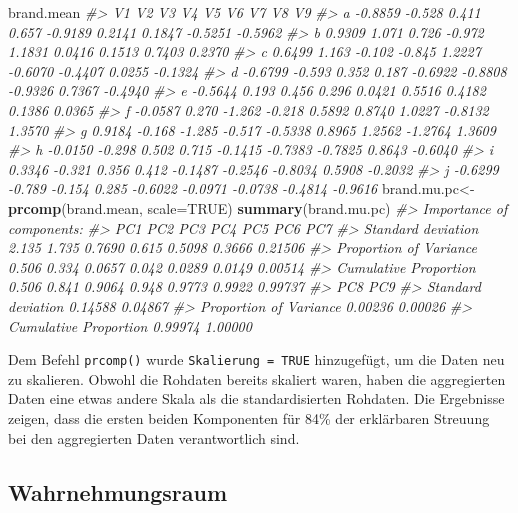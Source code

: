 \documentclass[12pt,]{book}
\newenvironment{Shaded}{\begin{snugshade}}{\end{snugshade}}
\newcommand{\KeywordTok}[1]{\textcolor[rgb]{0.13,0.29,0.53}{\textbf{{#1}}}}
\newcommand{\DataTypeTok}[1]{\textcolor[rgb]{0.13,0.29,0.53}{{#1}}}
\newcommand{\StringTok}[1]{\textcolor[rgb]{0.31,0.60,0.02}{{#1}}}
\newcommand{\CommentTok}[1]{\textcolor[rgb]{0.56,0.35,0.01}{\textit{{#1}}}}
\newcommand{\OtherTok}[1]{\textcolor[rgb]{0.56,0.35,0.01}{{#1}}}
\newcommand{\NormalTok}[1]{{#1}}
\begin{document}
\begin{Shaded}
\begin{Highlighting}[]
\NormalTok{brand.mean}
\CommentTok{#>        V1     V2     V3     V4      V5      V6      V7      V8      V9}
\CommentTok{#> a -0.8859 -0.528  0.411  0.657 -0.9189  0.2141  0.1847 -0.5251 -0.5962}
\CommentTok{#> b  0.9309  1.071  0.726 -0.972  1.1831  0.0416  0.1513  0.7403  0.2370}
\CommentTok{#> c  0.6499  1.163 -0.102 -0.845  1.2227 -0.6070 -0.4407  0.0255 -0.1324}
\CommentTok{#> d -0.6799 -0.593  0.352  0.187 -0.6922 -0.8808 -0.9326  0.7367 -0.4940}
\CommentTok{#> e -0.5644  0.193  0.456  0.296  0.0421  0.5516  0.4182  0.1386  0.0365}
\CommentTok{#> f -0.0587  0.270 -1.262 -0.218  0.5892  0.8740  1.0227 -0.8132  1.3570}
\CommentTok{#> g  0.9184 -0.168 -1.285 -0.517 -0.5338  0.8965  1.2562 -1.2764  1.3609}
\CommentTok{#> h -0.0150 -0.298  0.502  0.715 -0.1415 -0.7383 -0.7825  0.8643 -0.6040}
\CommentTok{#> i  0.3346 -0.321  0.356  0.412 -0.1487 -0.2546 -0.8034  0.5908 -0.2032}
\CommentTok{#> j -0.6299 -0.789 -0.154  0.285 -0.6022 -0.0971 -0.0738 -0.4814 -0.9616}
\NormalTok{brand.mu.pc<-}\StringTok{ }\KeywordTok{prcomp}\NormalTok{(brand.mean, }\DataTypeTok{scale=}\OtherTok{TRUE}\NormalTok{)}
\KeywordTok{summary}\NormalTok{(brand.mu.pc)}
\CommentTok{#> Importance of components:}
\CommentTok{#>                          PC1   PC2    PC3   PC4    PC5    PC6     PC7}
\CommentTok{#> Standard deviation     2.135 1.735 0.7690 0.615 0.5098 0.3666 0.21506}
\CommentTok{#> Proportion of Variance 0.506 0.334 0.0657 0.042 0.0289 0.0149 0.00514}
\CommentTok{#> Cumulative Proportion  0.506 0.841 0.9064 0.948 0.9773 0.9922 0.99737}
\CommentTok{#>                            PC8     PC9}
\CommentTok{#> Standard deviation     0.14588 0.04867}
\CommentTok{#> Proportion of Variance 0.00236 0.00026}
\CommentTok{#> Cumulative Proportion  0.99974 1.00000}
\end{Highlighting}
\end{Shaded}

Dem Befehl \texttt{prcomp()} wurde \texttt{Skalierung\ =\ TRUE}
hinzugefügt, um die Daten neu zu skalieren. Obwohl die Rohdaten bereits
skaliert waren, haben die aggregierten Daten eine etwas andere Skala als
die standardisierten Rohdaten. Die Ergebnisse zeigen, dass die ersten
beiden Komponenten für 84\% der erklärbaren Streuung bei den
aggregierten Daten verantwortlich sind.

\subsection{Wahrnehmungsraum}\label{wahrnehmungsraum}
\end{document}
